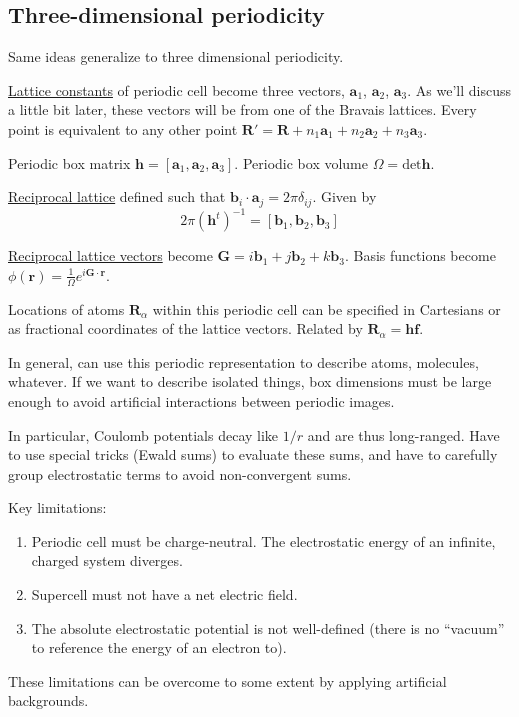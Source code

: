 \documentclass[11pt]{article}
\begin{document}
\subsection{Three-dimensional periodicity}
\label{sec:org5166b80}
Same ideas generalize to three dimensional periodicity.

\uline{Lattice constants} of periodic cell become three vectors, \(\bm{a}_1\), \(\bm{a}_2\), \(\bm{a}_3\).  As we'll discuss a little bit later, these vectors will be from one of the Bravais lattices.  Every point  is equivalent to any other point \(\bm{R}'=\bm{R} + n_1 \bm{a}_1+ n_2 \bm{a}_2+ n_3 \bm{a}_3\).

Periodic box matrix \(\bm{h} = [\bm{a}_1, \bm{a}_2,\bm{a}_3]\).  Periodic box volume \(\Omega = \text{det} \bm{h}\).

\uline{Reciprocal lattice} defined such that \(\bm{b}_i\cdot\bm{a}_j = 2 \pi \delta_{ij}\).  Given by
\[2\pi(\bm{h}^t)^{-1} = [\bm{b}_1,\bm{b}_2,\bm{b}_3]\]

\uline{Reciprocal lattice vectors} become \(\bm{G} = i \bm{b}_1 + j \bm{b}_2 + k \bm{b}_3\).  Basis functions become \(\phi(\bm{r}) = \frac{1}{\Omega}e^{i \bm{G}\cdot\bm{r}}\).

Locations of atoms \(\bm{R}_\alpha\) within this periodic cell can be specified in Cartesians or as fractional coordinates of the lattice vectors.  Related by \(\bm{R}_\alpha = \bm{h}\bm{f}\).

In general, can use this periodic representation to describe atoms, molecules, whatever.  If we want to describe isolated things, box dimensions must be large enough to avoid artificial interactions between periodic images. 

In particular, Coulomb potentials decay like \(1/r\) and are thus long-ranged.  Have to use special tricks (Ewald sums) to evaluate these sums, and have to carefully group electrostatic terms to avoid non-convergent sums.

Key limitations:
\begin{enumerate}
\item Periodic cell must be charge-neutral.  The electrostatic energy of an infinite, charged system diverges.
\item Supercell must not have a net electric field.
\item The absolute electrostatic potential is not well-defined (there is no ``vacuum'' to reference the energy of an electron to).
\end{enumerate}
These limitations can be overcome to some extent by applying artificial backgrounds.
\end{document}
